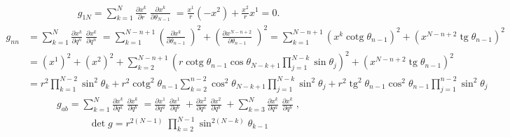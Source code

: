 \documentclass[10pt,a4paper]{article}
\newcommand{\tg}{\operatorname{tg}}
\newcommand{\cotg}{\operatorname{cotg}}
\newcommand{\pd}[2]{\frac{\partial  #1}{\partial  #2} \;}
\begin{document}
\begin{align*}
    g_{1N} = \sum_{k=1}^N \pd{x^k}{r} \pd{x^k}{\theta_{N-1}} = \frac{x^1}{r} \left( -x^2 \right) + \frac{x^2}{r} x^1 = 0.
\end{align*}
\begin{align*}
    g_{nn} &= \sum_{k=1}^N \pd{x^k}{q^n} \pd{x^k}{q^n} = \!\!\! \sum_{k=1}^{N-n+1} \!\! \left( \pd{x^k}{\theta_{n-1}} \!\!\right)^2 \!\! + \left(\pd{x^{N-n+2}}{\theta_{n-1}}\!\!\right)^2 = \!\!\! \sum_{k=1}^{N-n+1} \!\! \left( x^k \cotg \theta_{n-1} \right)^2 \!\! + \left( x^{N-n+2} \tg \theta_{n-1} \right)^2 \\[2pt]
    &= \left(x^1\right)^2 + \left(x^2\right)^2 + \sum_{k=2}^{N-n+1} \left( r \cotg \theta_{n-1} \cos \theta_{N-k+1} \prod_{j=1}^{N-k} \sin \theta_j \right)^2 + \left( x^{N-n+2} \tg \theta_{n-1} \right)^2 \\[2pt]
    &= r^2 \prod_{k=1}^{N-2} \sin^2 \theta_k + r^2 \cotg^2 \theta_{n-1} \sum_{k=2}^{n-2} \cos^2 \theta_{N-k+1} \prod_{j=1}^{N-k} \sin^2 \theta_j + r^2 \tg^2 \theta_{n-1} \cos^2 \theta_{n-1} \prod_{j=1}^{n-2} \sin^2 \theta_j
\end{align*}
\begin{align*}
    g_{ab} = \sum_{k=1}^N \pd{x^k}{q^a} \pd{x^k}{q^b}
    = \pd{x^1}{q^a}\pd{x^1}{q^b} + \pd{x^2}{q^a}\pd{x^2}{q^b} + \sum_{k=3}^N \pd{x^k}{q^a} \pd{x^k}{q^b},
\end{align*}
\begin{align*}
    \det g = r^{2(N-1)} \; \prod_{k=2}^{N-1} \sin^{2(N - k)} \theta_{k-1}
\end{align*}
\end{document}

